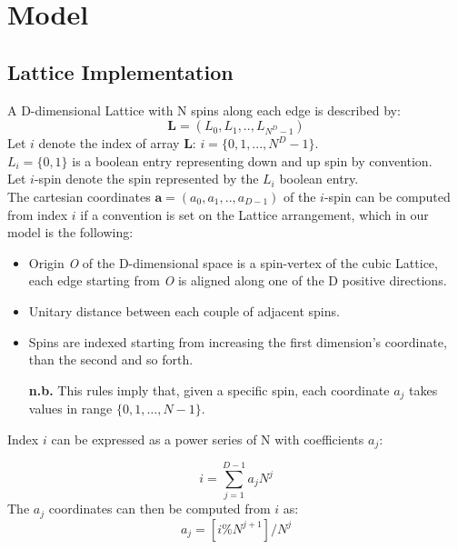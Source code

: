 \documentclass[11pt,a4paper]{article}
\begin{document}
\newpage


\section{Model}

\subsection{Lattice Implementation}

A D-dimensional Lattice with N spins along each edge is described by:
$$\mathbf{L} = (L_0,L_1,..,L_{N^D-1})$$
Let $i$ denote the index of array $\mathbf{L}$: $i = \{0,1,...,N^D -1\}$.\\
$L_i = \{0,1\}$ is a boolean entry representing down and up spin by convention. \\
Let $i$-spin denote the spin represented by the $L_i$ boolean entry. \\
The cartesian coordinates $\mathbf{a} = (a_0,a_1,..,a_{D-1})$ of the $i$-spin can be computed from index $i$ if a convention is set on the Lattice arrangement, which in our model is the following:
\begin{itemize}
\item Origin \textit{O} of the D-dimensional space is a spin-vertex of the cubic Lattice, each edge starting from \textit{O} is aligned along one of the D positive directions.
\item Unitary distance between each couple of adjacent spins.
\item Spins are indexed starting from increasing the first dimension’s coordinate, than the second and so forth.
\item[\textbf{n.b.}] This rules imply that, given a specific spin, each coordinate $a_j$ takes values in range $\{0,1,…,N-1\}$. \\
\end{itemize}
Index $i$ can be expressed as a power series of N with coefficients $a_j$:

\begin{equation}
i = \sum_{j=1}^{D-1}a_jN^j
\end{equation}
The $a_j$ coordinates can then be computed from $i$ as:
\begin{equation}
a_j = [i\%N^{j+1}]/N^j
\end{equation}

\end{document}

